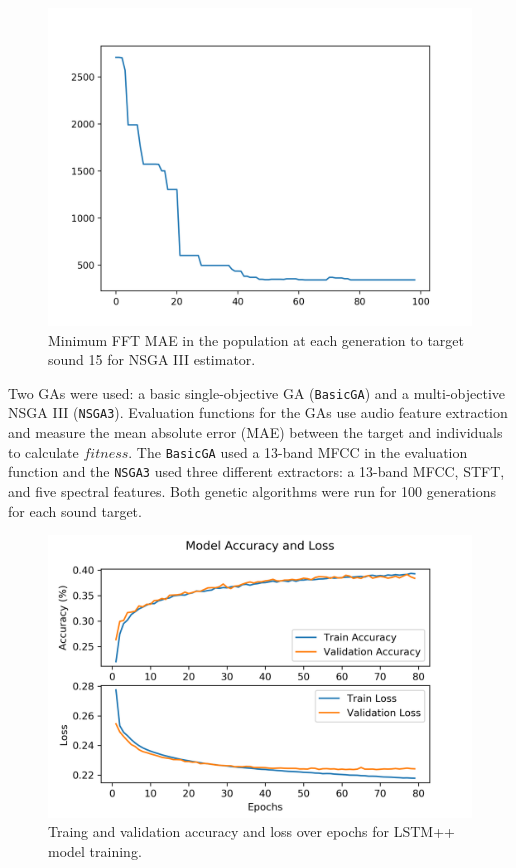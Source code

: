 \begin{figure}[]
\begin{center}
\includegraphics[width=0.95\columnwidth]{nsga_target_15_FFT.png}
\caption{Minimum FFT MAE in the population at each generation to target sound 15 for NSGA III estimator.}
\label{fig:nsga_fitness}
\end{center}
\end{figure}

Two GAs were used: a basic single-objective GA (\texttt{BasicGA}) and a multi-objective NSGA III (\texttt{NSGA3}). Evaluation functions for the GAs use audio feature extraction and measure the mean absolute error (MAE) between the target and individuals to calculate $fitness$. The \texttt{BasicGA} used a 13-band MFCC in the evaluation function and the \texttt{NSGA3} used three different extractors: a 13-band MFCC, STFT, and five spectral features. Both genetic algorithms were run for 100 generations for each sound target.

\begin{figure}[t]
\begin{center}
\includegraphics[width=0.95\columnwidth]{blstm_training.png}
\caption{Traing and validation accuracy and loss over epochs for LSTM++ model training.}
\label{fig:lstm_bi_train}
\end{center}
\end{figure}

